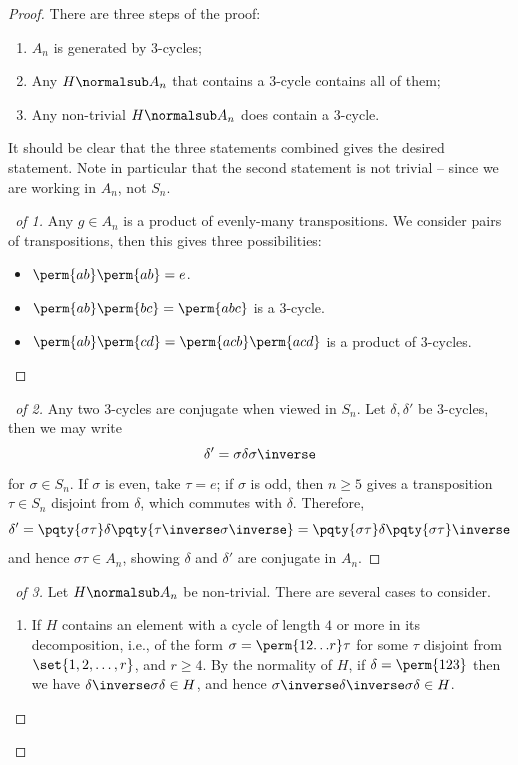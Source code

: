 \begin{proof}
    There are three steps of the proof:
    \begin{enumerate}
        \item \(A_n\) is generated by \(3\)-cycles;
        \item Any \(H \normalsub A_n\) that contains a \(3\)-cycle contains all of them;
        \item Any non-trivial \(H \normalsub A_n\) does contain a \(3\)-cycle.
    \end{enumerate}

    It should be clear that the three statements combined gives the desired statement. Note in particular that the second statement is not trivial -- since we are working in \(A_n\), not \(S_n\).

    \begin{proof}[\proofname\ of 1]
        Any \(g \in A_n\) is a product of evenly-many transpositions. We consider pairs of transpositions, then this gives three possibilities:
        \begin{itemize}
            \item \(\perm{ab} \perm{ab} = e\).
            \item \(\perm{ab} \perm{bc} = \perm{abc}\) is a \(3\)-cycle.
            \item \(\perm{ab} \perm{cd} = \perm{acb} \perm{acd}\) is a product of \(3\)-cycles.
        \end{itemize}
    \end{proof}

    \begin{proof}[\proofname\ of 2]
        Any two \(3\)-cycles are conjugate when viewed in \(S_n\). Let \(\delta, \delta'\) be \(3\)-cycles, then we may write
        \[
            \delta' = \sigma \delta \sigma\inverse
        \]
        for \(\sigma \in S_n\). If \(\sigma\) is even, take \(\tau=e\); if \(\sigma\) is odd, then \(n \geq 5\) gives a transposition \(\tau \in S_n\) disjoint from \(\delta\), which commutes with \(\delta\). Therefore,
        \[
            \delta' = \pqty{\sigma \tau} \delta \pqty{\tau\inverse \sigma\inverse} = \pqty{\sigma \tau} \delta \pqty{\sigma \tau}\inverse
        \]
        and hence \(\sigma \tau \in A_n\), showing \(\delta\) and \(\delta'\) are conjugate in \(A_n\).
    \end{proof}

    \begin{proof}[\proofname\ of 3]
        Let \(H \normalsub A_n\) be non-trivial. There are several cases to consider.
        \begin{enumerate}
            \item If \(H\) contains an element with a cycle of length \(4\) or more in its decomposition, i.e., of the form \(\sigma = \perm{1 2 {\ldots} r} \tau\) for some \(\tau\) disjoint from \(\set{1, 2, \ldots, r}\), and \(r \geq 4\). By the normality of \(H\), if \(\delta = \perm{1 2 3}\) then we have \(\delta\inverse \sigma \delta \in H\), and hence \(\sigma\inverse \delta\inverse \sigma \delta \in H\).
            

\end{enumerate}
\end{proof}
\end{proof}
